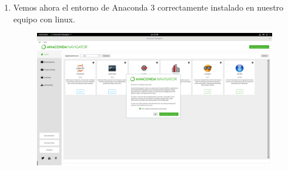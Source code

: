 \documentclass[12pt]{article}
\begin{document}
\begin{enumerate}
\item Vemos ahora el entorno de Anaconda 3 correctamente instalado en nuestro equipo con linux.
\begin{figure}[H]
 	\centering
 	\includegraphics[scale=0.15]{Imagenes/Instalacion_Anaconda_01_linux_12}
\end{figure}
\end{enumerate}
\end{document}
